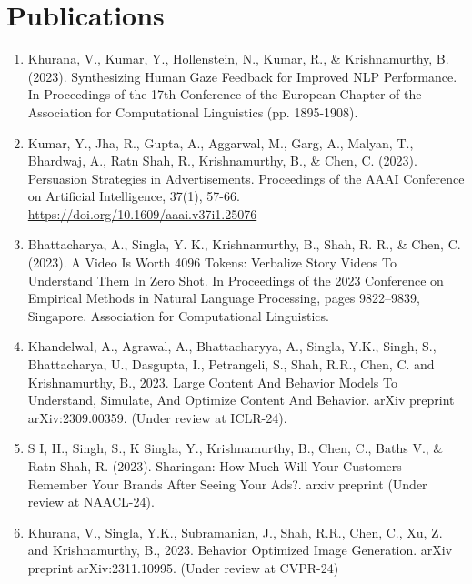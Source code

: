 \documentclass[hidelinks,11pt,a4paper]{report}
\begin{document}
\chapter*{Publications}
\begin{enumerate}
    \item Khurana, V., Kumar, Y., Hollenstein, N., Kumar, R., \& Krishnamurthy, B. (2023). Synthesizing Human Gaze Feedback for Improved NLP Performance. In Proceedings of the 17th Conference of the European Chapter of the Association for Computational Linguistics (pp. 1895-1908).
    
    \item Kumar, Y., Jha, R., Gupta, A., Aggarwal, M., Garg, A., Malyan, T., Bhardwaj, A., Ratn Shah, R., Krishnamurthy, B., \& Chen, C. (2023). Persuasion Strategies in Advertisements. Proceedings of the AAAI Conference on Artificial Intelligence, 37(1), 57-66. \url{https://doi.org/10.1609/aaai.v37i1.25076}

    \item Bhattacharya, A., Singla, Y. K., Krishnamurthy, B., Shah, R. R., \& Chen, C. (2023). A Video Is Worth 4096 Tokens: Verbalize Story Videos To Understand Them In Zero Shot. In Proceedings of the 2023 Conference on Empirical Methods in Natural Language Processing, pages 9822–9839, Singapore. Association for Computational Linguistics.

    \item Khandelwal, A., Agrawal, A., Bhattacharyya, A., Singla, Y.K., Singh, S., Bhattacharya, U., Dasgupta, I., Petrangeli, S., Shah, R.R., Chen, C. and Krishnamurthy, B., 2023. Large Content And Behavior Models To Understand, Simulate, And Optimize Content And Behavior. arXiv preprint arXiv:2309.00359. (Under review at ICLR-24). 

    \item  S I, H., Singh, S., K Singla, Y., Krishnamurthy, B., Chen, C., Baths V., \& Ratn Shah, R. (2023). Sharingan: How Much Will Your Customers Remember Your Brands After Seeing Your Ads?. arxiv preprint (Under review at NAACL-24).

    \item Khurana, V., Singla, Y.K., Subramanian, J., Shah, R.R., Chen, C., Xu, Z. and Krishnamurthy, B., 2023. Behavior Optimized Image Generation. arXiv preprint arXiv:2311.10995. (Under review at CVPR-24)

\end{enumerate}




\end{document}
